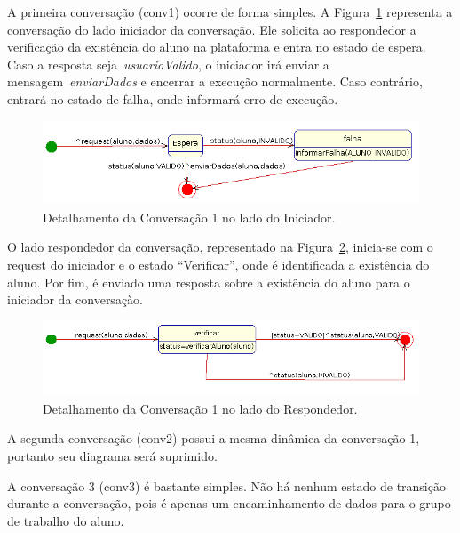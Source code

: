 A primeira conversação (conv1) ocorre de forma simples. A Figura~\ref{fig:conv1-iniciador} representa a conversação do lado iniciador da conversação. Ele solicita ao respondedor a verificação da existência do aluno na plataforma e entra no estado de espera. Caso a resposta seja~\emph{usuarioValido}, o iniciador irá enviar a mensagem~\emph{enviarDados} e encerrar a execução normalmente. Caso contrário, entrará no estado de falha, onde informará erro de execução.
\begin{figure}
	\centering
	\includegraphics[scale=0.48]{images/conv1-iniciador.png}
	\caption{Detalhamento da Conversação 1 no lado do Iniciador.}
	\label{fig:conv1-iniciador}
\end{figure}
O lado respondedor da conversação, representado na Figura~\ref{fig:conv1-respondedor}, inicia-se com o request do iniciador e o estado ``Verificar'', onde é identificada a existência do aluno. Por fim, é enviado uma resposta sobre a existência do aluno para o iniciador da conversaçào.

\begin{figure}
	\centering
	\includegraphics[scale=0.48]{images/conv1-recebedor.png}
	\caption{Detalhamento da Conversação 1 no lado do Respondedor.}
	\label{fig:conv1-respondedor}
\end{figure}

A segunda conversação (conv2) possui a mesma dinâmica da conversação 1, portanto seu diagrama será suprimido.

A conversação 3 (conv3) é bastante simples. Não há nenhum estado de transição durante a conversação, pois é apenas um encaminhamento de dados para o grupo de trabalho do aluno.

